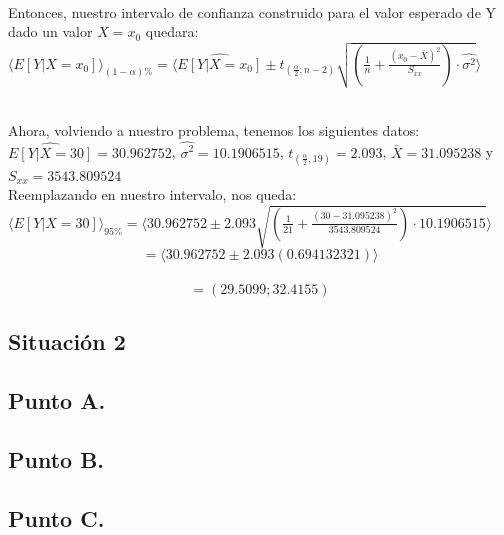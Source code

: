 \documentclass[letterpaper,12pt,onecolumn,titlepage]{article}
\begin{document}
~\\ Entonces, nuestro intervalo de confianza construido para el valor esperado de Y dado un valor $X=x_{0}$ quedara:
~\\ $\langle E[Y|X=x_{0}] \rangle _{(1-\alpha)\%}=\langle \hat{E[Y|X=x_{0}]}\pm t_{(\frac{\alpha}{2};n-2)}\sqrt{(\frac{1}{n}+\frac{(x_{0}-\bar{X})^2}{S_{xx}})\cdot \hat{\sigma^2}} \rangle$

~\\ Ahora, volviendo a nuestro problema, tenemos los siguientes datos: $\hat{E[Y|X=30]}=30.962752$, $\hat{\sigma^2}=10.1906515$, $t_{(\frac{\alpha}{2},19)}=2.093$, $\bar{X}=31.095238$ y $S_{xx}=3543.809524$
~\\ Reemplazando en nuestro intervalo, nos queda: 
~\\ $\langle E[Y|X=30] \rangle _{95\%}=\langle 30.962752 \pm 2.093\sqrt{(\frac{1}{21}+\frac{(30-31.095238)^2}{3543.809524})\cdot 10.1906515} \rangle$
~\\ $$=\langle 30.962752 \pm 2.093(0.694132321)\rangle$$
~\\ $$=(29.5099 ; 32.4155)$$
\pagebreak\subsection{Situaci\'{o}n 2}
\subsection{Punto A.}
\subsection{Punto B.}
\subsection{Punto C.}


\end{document}
